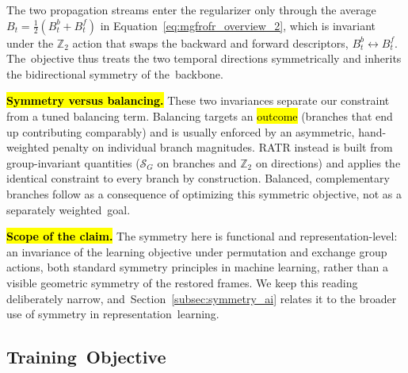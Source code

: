\documentclass[symmetry,article,accept,pdftex,moreauthors]{Definitions/mdpi}
\begin{document}
\begin{Property}
The two propagation streams enter the regularizer only through the average $B_t=\tfrac{1}{2}(B_t^{b}+B_t^{f})$ in Equation~\eqref{eq:mgfrofr_overview_2}, which is invariant under the $\mathbb{Z}_2$ action that swaps the backward and forward descriptors, $B_t^{b}\!\leftrightarrow\!B_t^{f}$. The~objective thus treats the two temporal directions symmetrically and inherits the bidirectional symmetry of the~backbone.
\end{Property}


\textbf{\hl{Symmetry versus balancing.}%
} These two invariances separate our constraint from a tuned balancing term. Balancing targets an \hl{outcome}%
 (branches that end up contributing comparably) and is usually enforced by an asymmetric, hand-weighted penalty on individual branch magnitudes. RATR instead is built from group-invariant quantities ($\mathcal{S}_G$ on branches and $\mathbb{Z}_2$ on directions) and applies the identical constraint to every branch by construction. Balanced, complementary branches follow as a consequence of optimizing this symmetric objective, not as a separately weighted~goal.

\textbf{\hl{Scope of the claim.}} The symmetry here is functional and representation-level: an invariance of the learning objective under permutation and exchange group actions, both standard symmetry principles in machine learning, rather than a visible geometric symmetry of the restored frames. We keep this reading deliberately narrow, and~Section~\ref{subsec:symmetry_ai} relates it to the broader use of symmetry in representation~learning.

\subsection{Training~Objective}
\label{subsec:training_objective}
\end{document}
